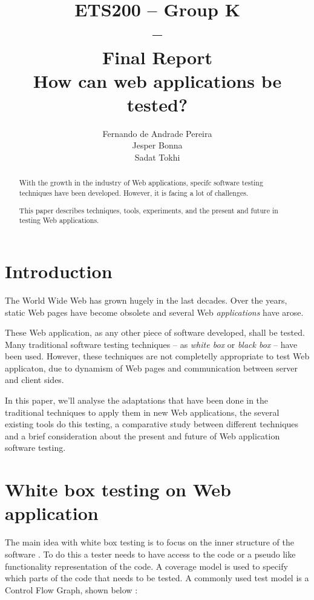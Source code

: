 \documentclass[a4paper, twocolumn]{ieee}
\title{ETS200 -- Group K\\--\\ Final Report \\
How can web applications be tested?
}
\author{Fernando de Andrade Pereira
\\Jesper Bonna
\\Sadat Tokhi
}
\begin{document}
\maketitle
\thispagestyle{empty}
\clearpage

\begin{abstract}
With the growth in the industry of Web applications, specifc software testing techniques have been developed. 
However, it is facing a lot of challenges.

This paper describes techniques, tools, experiments, and the present and future in testing Web applications. 

\end{abstract}
\thispagestyle{empty}
\clearpage

\tableofcontents
\thispagestyle{empty}
\clearpage

\setcounter{page}{1}

\section{Introduction}
The World Wide Web has grown hugely in the last decades.
Over the years, static Web pages have become obsolete and several Web \emph{applications} have arose.

These Web application, as any other piece of software developed, shall be tested.
Many traditional software testing techniques  -- as \emph{white box} or \emph{black box} -- have been used.
However, these techniques are not completelly appropriate to test Web applicaton, due to dynamism of Web pages and communication between server and client sides.

In this paper, we'll analyse the adaptations that have been done in the traditional techniques to apply them in new Web applications, the several existing tools do this testing, a comparative study between different techniques and a brief consideration about the present and future of Web application software testing.

\section{White box testing on Web application}
The main idea with white box testing is to focus on the inner structure of the software \cite{ib03}. To do this
a tester needs to have access to the code or a pseudo like functionality representation of the code. A
coverage model is used to specify which parts of the code that needs to be tested. A commonly used
test model is a Control Flow Graph, shown below \cite{p91}:
\end{document}
